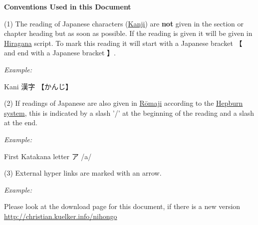 \bigskip

\textbf{Conventions Used in this Document}\label{para:Conventions}

\bigskip

(1) The reading of Japanese characters (\hyperref[sec:Kanji]{Kanji}) are
\textbf{not} given in the section or chapter heading but as soon as possible.
If the reading is given it will be given in \hyperref[sec:Hiragana]{Hiragana}
script. To mark this reading it will start with a Japanese bracket {【} and end
with a Japanese bracket {】}.

\bigskip
\textit{Example:}

\bigskip
\begin{center}
     Kani {漢字} {【かんじ】}
\end{center}

\bigskip

(2) If readings of Japanese are also given in \hyperref[sec:Romaji]{Rōmaji}
according to the \hyperref[sec:Hepburn]{Hepburn system}, this is indicated by a
slash '/' at the beginning of the reading and a slash at the end.

\bigskip
\textit{Example:}

\bigskip
\begin{center}
     First Katakana letter {ア} {/a/}
\end{center}

\bigskip

(3) External hyper links are marked with an arrow.

\bigskip
\textit{Example:}

\bigskip
\begin{center}
     Please look at the download page for this document, if there is a new
     version\\ \Link
     \href{http://christian.kuelker.info/nihongo}{http://christian.kuelker.info/nihongo}
\end{center}

